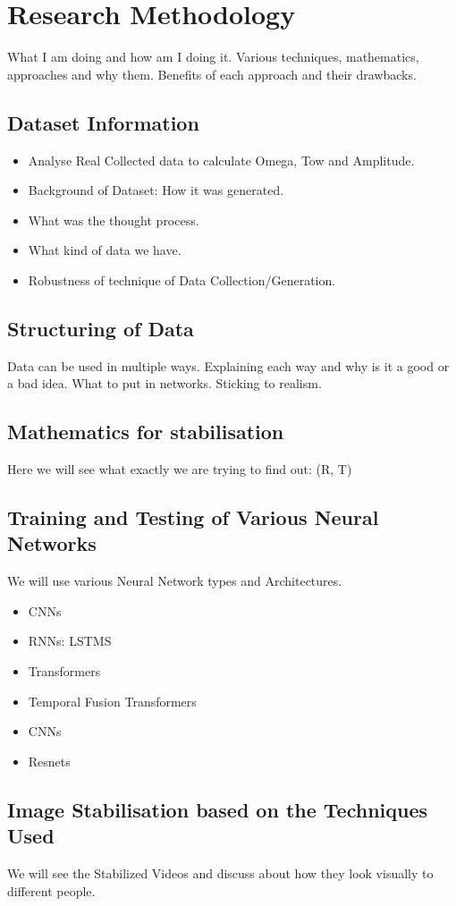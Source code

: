 \chapter{Research Methodology} \label{chapter_four}

What I am doing and how am I doing it. Various techniques, mathematics, approaches and why them. Benefits of each approach and their drawbacks.

\section{Dataset Information}
\begin{itemize}
\item Analyse Real Collected data to calculate Omega, Tow and Amplitude. 
\item Background of Dataset: How it was generated. 
\item What was the thought process. 
\item What kind of data we have.
\item Robustness of technique of Data Collection/Generation.
\end{itemize}
\section{Structuring of Data}
Data can be used in multiple ways. Explaining each way and why is it a good or a bad idea. What to put in networks. Sticking to realism.

\section{Mathematics for stabilisation}
Here we will see what exactly we are trying to find out: (R, T)

\section{Training and Testing of Various Neural Networks}
We will use various Neural Network types and Architectures.

\begin{itemize}
\item CNNs
\item RNNs: LSTMS 
\item Transformers
\item Temporal Fusion Transformers
\item CNNs
\item Resnets
\end{itemize}

\section{Image Stabilisation based on the Techniques Used}
We will see the Stabilized Videos and discuss about how they look visually to different people.


